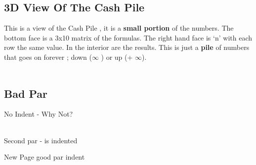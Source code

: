 \documentclass[12pt,letterpaper,oneside,titlepage]{article}
\makeatletter
\newcommand{\tikzcuboid@shiftx}{0}
\newcommand{\tikzcuboid@shifty}{0}
\newcommand{\tikzcuboid@dimx}{3}
\newcommand{\tikzcuboid@dimy}{3}
\newcommand{\tikzcuboid@dimz}{3}
\newcommand{\tikzcuboid@scale}{1}
\newcommand{\tikzcuboid@densityx}{1}
\newcommand{\tikzcuboid@densityy}{1}
\newcommand{\tikzcuboid@densityz}{1}
\newcommand{\tikzcuboid@rotation}{0}
\newcommand{\tikzcuboid@anglex}{0}
\newcommand{\tikzcuboid@angley}{90}
\newcommand{\tikzcuboid@anglez}{225}
\newcommand{\tikzcuboid@scalex}{1}
\newcommand{\tikzcuboid@scaley}{1}
\newcommand{\tikzcuboid@scalez}{sqrt(0.5)}
\newcommand{\tikzcuboid@linefront}{black}
\newcommand{\tikzcuboid@linetop}{black}
\newcommand{\tikzcuboid@lineright}{black}
\newcommand{\tikzcuboid@fillfront}{white}
\newcommand{\tikzcuboid@filltop}{white}
\newcommand{\tikzcuboid@fillright}{white}
\newcommand{\tikzcuboid@emphedge}{N}
\newcommand{\tikzcuboid@emphstyle}{thick}
\newcommand{\tikzcuboid}[1]{
    \setkeys{tikzcuboid}{#1} %
    \pgfmathsetmacro{\vectorxx}{\tikzcuboid@scalex*cos(\tikzcuboid@anglex)}
    \pgfmathsetmacro{\vectorxy}{\tikzcuboid@scalex*sin(\tikzcuboid@anglex)}
    \pgfmathsetmacro{\vectoryx}{\tikzcuboid@scaley*cos(\tikzcuboid@angley)}
    \pgfmathsetmacro{\vectoryy}{\tikzcuboid@scaley*sin(\tikzcuboid@angley)}
    \pgfmathsetmacro{\vectorzx}{\tikzcuboid@scalez*cos(\tikzcuboid@anglez)}
    \pgfmathsetmacro{\vectorzy}{\tikzcuboid@scalez*sin(\tikzcuboid@anglez)}
    \begin{scope}[xshift=\tikzcuboid@shiftx, yshift=\tikzcuboid@shifty, scale=\tikzcuboid@scale, rotate=\tikzcuboid@rotation, x={(\vectorxx,\vectorxy)}, y={(\vectoryx,\vectoryy)}, z={(\vectorzx,\vectorzy)}]
        \pgfmathsetmacro{\steppingx}{1/\tikzcuboid@densityx}
        \pgfmathsetmacro{\steppingy}{1/\tikzcuboid@densityy}
        \pgfmathsetmacro{\steppingz}{1/\tikzcuboid@densityz}
        \newcommand{\dimx}{\tikzcuboid@dimx}
        \newcommand{\dimy}{\tikzcuboid@dimy}
        \newcommand{\dimz}{\tikzcuboid@dimz}
        \pgfmathsetmacro{\secondx}{2*\steppingx}
        \pgfmathsetmacro{\secondy}{2*\steppingy}
        \pgfmathsetmacro{\secondz}{2*\steppingz}
        \foreach \x in {\steppingx,\secondx,...,\dimx}
        {   \foreach \y in {\steppingy,\secondy,...,\dimy}
            {   \pgfmathsetmacro{\lowx}{(\x-\steppingx)}
                \pgfmathsetmacro{\lowy}{(\y-\steppingy)}
                \filldraw[fill=\tikzcuboid@fillfront,draw=\tikzcuboid@linefront] (\lowx,\lowy,\dimz) -- (\lowx,\y,\dimz) -- (\x,\y,\dimz) -- (\x,\lowy,\dimz) -- cycle;
                
            }
        }
        \foreach \x in {\steppingx,\secondx,...,\dimx}
        {   \foreach \z in {\steppingz,\secondz,...,\dimz}
            {   \pgfmathsetmacro{\lowx}{(\x-\steppingx)}
                \pgfmathsetmacro{\lowz}{(\z-\steppingz)}
                \filldraw[fill=\tikzcuboid@filltop,draw=\tikzcuboid@linetop] (\lowx,\dimy,\lowz) -- (\lowx,\dimy,\z) -- (\x,\dimy,\z) -- (\x,\dimy,\lowz) -- cycle;
            }
        }
        \foreach \y in {\steppingy,\secondy,...,\dimy}
        {   \foreach \z in {\steppingz,\secondz,...,\dimz}
            {   \pgfmathsetmacro{\lowy}{(\y-\steppingy)}
                \pgfmathsetmacro{\lowz}{(\z-\steppingz)}
                \filldraw[fill=\tikzcuboid@fillright,draw=\tikzcuboid@lineright] (\dimx,\lowy,\lowz) -- (\dimx,\lowy,\z) -- (\dimx,\y,\z) -- (\dimx,\y,\lowz) -- cycle;
            }
        }
        \ifthenelse{\equal{\tikzcuboid@emphedge}{Y}}%
        {\draw[\tikzcuboid@emphstyle](0,\dimy,0) -- (\dimx,\dimy,0) -- (\dimx,\dimy,\dimz) -- (0,\dimy,\dimz) -- cycle;%
            \draw[\tikzcuboid@emphstyle] (0,0,\dimz) -- (0,\dimy,\dimz) -- (\dimx,\dimy,\dimz) -- (\dimx,0,\dimz) -- cycle;%
            \draw[\tikzcuboid@emphstyle](\dimx,0,0) -- (\dimx,\dimy,0) -- (\dimx,\dimy,\dimz) -- (\dimx,0,\dimz) -- cycle;%
        }%
        {}
    \end{scope}
}
\makeatother
\begin{document}
\subsection{3D View Of The Cash Pile}
\par 
This is a view of the Cash Pile , it is a \textbf{small portion} of the numbers. The bottom face is a 3x10 matrix of the formulas. The right hand face is  `n' with each row the same value. In the interior are the results. This is just a \textbf{pile} of numbers that goes on forever  ; down (\textendash $\infty$ ) or up (+ $\infty$).
\\
\\


\subsection{Bad Par}
\par 
No Indent  - Why Not?
\\
\\
\par 
Second par - is indented
\pagebreak
\par
New Page good par indent
\end{document}
